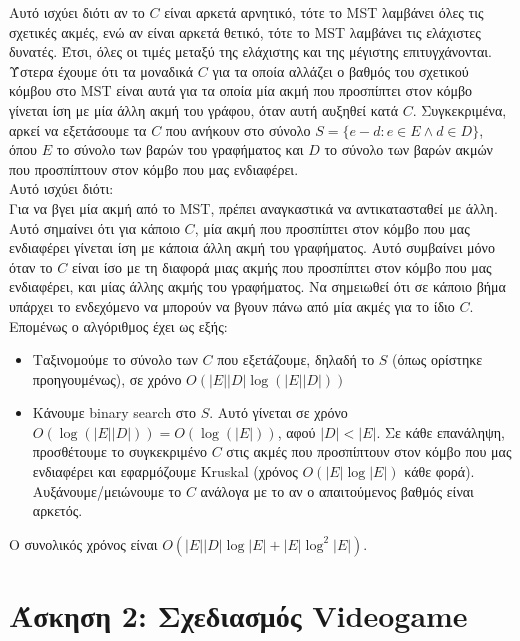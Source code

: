		Αυτό ισχύει διότι αν το $C$ είναι αρκετά αρνητικό, τότε το MST λαμβάνει όλες τις σχετικές ακμές, ενώ αν είναι αρκετά θετικό, τότε το MST λαμβάνει τις ελάχιστες δυνατές. Έτσι, όλες οι τιμές μεταξύ της ελάχιστης και της μέγιστης επιτυγχάνονται. \\
		
		Ύστερα έχουμε ότι τα μοναδικά $C$ για τα οποία αλλάζει ο βαθμός του σχετικού κόμβου στο MST είναι αυτά για τα οποία μία ακμή που προσπίπτει στον κόμβο γίνεται ίση με μία άλλη ακμή του γράφου, όταν αυτή αυξηθεί κατά $C$. Συγκεκριμένα, αρκεί να εξετάσουμε τα $C$ που ανήκουν στο σύνολο $S = \{e - d : e \in E \land d \in D\}$, όπου $E$ το σύνολο των βαρών του γραφήματος και $D$ το σύνολο των βαρών ακμών που προσπίπτουν στον κόμβο που μας ενδιαφέρει. \\
		
		Αυτό ισχύει διότι: \\
		Για να βγει μία ακμή από το MST, πρέπει αναγκαστικά να αντικατασταθεί με άλλη. Αυτό σημαίνει ότι για κάποιο $C$, μία ακμή που προσπίπτει στον κόμβο που μας ενδιαφέρει γίνεται ίση με κάποια άλλη ακμή του γραφήματος. Αυτό συμβαίνει μόνο όταν το $C$ είναι ίσο με τη διαφορά μιας ακμής που προσπίπτει στον κόμβο που μας ενδιαφέρει, και μίας άλλης ακμής του γραφήματος. Να σημειωθεί ότι σε κάποιο βήμα υπάρχει το ενδεχόμενο να μπορούν να βγουν πάνω από μία ακμές για το ίδιο $C$. \\
		
		Επομένως ο αλγόριθμος έχει ως εξής: \\
		
		\begin{itemize}
			\item Ταξινομούμε το σύνολο των $C$ που εξετάζουμε, δηλαδή το $S$ (όπως ορίστηκε προηγουμένως), σε χρόνο $O\left(|E||D| \log\left(|E||D|\right)\right)$
			\item Κάνουμε binary search στο $S$. Αυτό γίνεται σε χρόνο $Ο(\log(|E||D|)) = O(\log(|E|))$, αφού $|D| < |E|$. Σε κάθε επανάληψη, προσθέτουμε το συγκεκριμένο $C$ στις ακμές που προσπίπτουν στον κόμβο που μας ενδιαφέρει και εφαρμόζουμε Kruskal (χρόνος $O(|E|\log|E|)$ κάθε φορά). Αυξάνουμε/μειώνουμε το $C$ ανάλογα με το αν ο απαιτούμενος βαθμός είναι αρκετός.  
		\end{itemize}
	
		Ο συνολικός χρόνος είναι $O(|E||D|\log|E| + |E|\log^2|E|)$.
		
\section*{Άσκηση 2: Σχεδιασμός Videogame}

